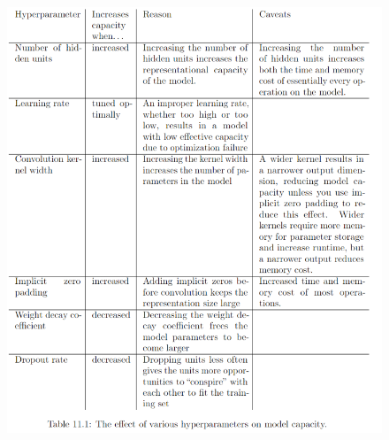 \begin{multicols}{2}
	\begin{figure}[H]
		\centering
		\includegraphics[width=1\linewidth]{images/hypertable.png}
	\end{figure}
	
\end{multicols}



































